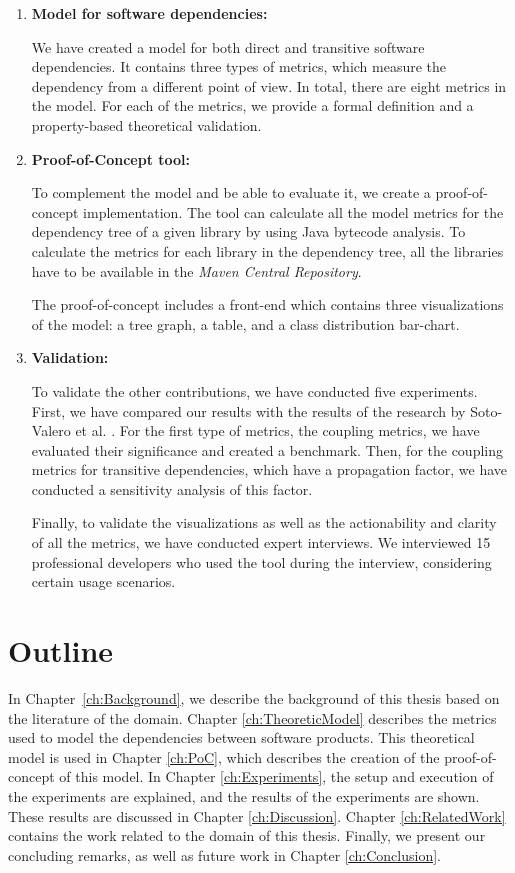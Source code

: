 \begin{enumerate}
  \item \textbf{Model for software dependencies:}

    We have created a model for both direct and transitive software dependencies. It contains three types of metrics, which measure the dependency from a different point of view. In total, there are eight metrics in the model. For each of the metrics, we provide a formal definition and a property-based theoretical validation.

  	\item \textbf{Proof-of-Concept tool:}

    To complement the model and be able to evaluate it, we create a proof-of-concept implementation. The tool can calculate all the model metrics for the dependency tree of a given library by using Java bytecode analysis. To calculate the metrics for each library in the dependency tree, all the libraries have to be available in the \textit{Maven Central Repository}.

    The proof-of-concept includes a front-end which contains three visualizations of the model: a tree graph, a table, and a class distribution bar-chart.

    \item \textbf{Validation:}

    To validate the other contributions, we have conducted five experiments. First, we have compared our results with the results of the research by Soto-Valero et al. \cite{soto2020comprehensive}. For the first type of metrics, the coupling metrics, we have evaluated their significance and created a benchmark. Then, for the coupling metrics for transitive dependencies, which have a propagation factor, we have conducted a sensitivity analysis of this factor.

    Finally, to validate the visualizations as well as the actionability and clarity of all the metrics, we have conducted expert interviews. We interviewed 15 professional developers who used the tool during the interview, considering certain usage scenarios.
    
\end{enumerate}

\section{Outline}
In Chapter~\ref{ch:Background}, we describe the background of this thesis based on the literature of the domain.
Chapter \ref{ch:TheoreticModel} describes the metrics used to model the dependencies between software products.
This theoretical model is used in Chapter \ref{ch:PoC}, which describes the creation of the proof-of-concept of this model.
In Chapter \ref{ch:Experiments}, the setup and execution of the experiments are explained, and the results of the experiments are shown. These results are discussed in Chapter \ref{ch:Discussion}. Chapter \ref{ch:RelatedWork} contains the work related to the domain of this thesis.
Finally, we present our concluding remarks, as well as future work in Chapter \ref{ch:Conclusion}.

